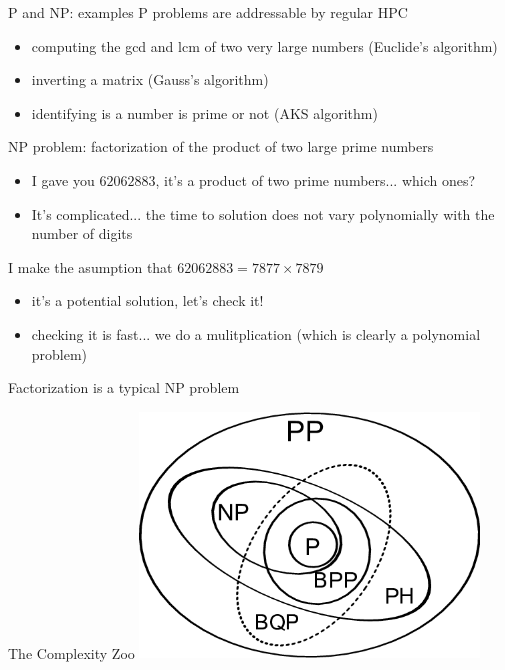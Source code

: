 \begin{frame}{P and NP: examples}
 P problems are addressable by regular HPC 
 \begin{itemize}
     \item computing the gcd and lcm of two very large numbers (Euclide's algorithm)
     \item inverting a matrix (Gauss's algorithm)
     \item identifying is a number is prime or not (AKS algorithm)
 \end{itemize}
NP problem: factorization of the product of two large prime numbers
 \begin{itemize}
     \item I gave you $62062883$, it's a product of two prime numbers... which ones?
     \item It's complicated... the time to solution does not vary polynomially with the number of digits
 \end{itemize}
 I make the asumption that $62062883= 7877 \times 7879$
 \begin{itemize}
     \item it's a potential solution, let's check it!
     \item checking it is fast... we do a mulitplication (which is clearly a polynomial problem)
 \end{itemize}
Factorization is a typical NP problem
\end{frame}

\begin{frame}{The Complexity Zoo}
\centering
    \includegraphics[width=9cm]{
        images/A-diagram-for-the-relations-between-complexity-classes-P-NP-PH-BPP-PP-and-BQP-Note.png}
\end{frame}

